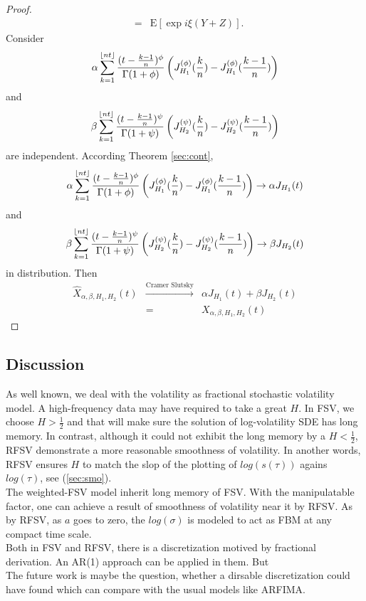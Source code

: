 \documentclass[a4paper, twoside, 11pt]{article}
\theoremstyle{definition}
\DeclarePairedDelimiter\floor{\lfloor}{\rfloor}
\newcommand{\brkt}[1]{\left({#1} \right)}
\begin{document}
\begin{proof}
\begin{eqnarray*}
  &=& \mathrm{E}[\exp{i\xi (Y+Z)}].
\end{eqnarray*}
Consider 
$$
\alpha\sum_{k=1}^{\floor{nt}} \frac{(t - \frac{k-1}{n})^\phi}{\Gamma(1+\phi)} \brkt{J_{H_1}^{(\phi)}(\frac{k}{n}) - J_{H_1}^{(\phi)}(\frac{k-1}{n})}$$
and 
$$\beta\sum_{k=1}^{\floor{nt}} \frac{(t - \frac{k-1}{n})^\psi}{\Gamma(1+\psi)} \brkt{J_{H_2}^{(\psi)}(\frac{k}{n}) - J_{H_2}^{(\psi)}(\frac{k-1}{n})}
$$
are independent. According Theorem \ref{sec:cont}, 
$$
\alpha\sum_{k=1}^{\floor{nt}} \frac{(t - \frac{k-1}{n})^\phi}{\Gamma(1+\phi)} \brkt{J_{H_1}^{(\phi)}(\frac{k}{n}) - J_{H_1}^{(\phi)}(\frac{k-1}{n})} \rightarrow \alpha J_{H_1}(t)
$$ and
$$
\beta\sum_{k=1}^{\floor{nt}} \frac{(t - \frac{k-1}{n})^\psi}{\Gamma(1+\psi)} \brkt{J_{H_2}^{(\psi)}(\frac{k}{n}) - J_{H_2}^{(\psi)}(\frac{k-1}{n})} \rightarrow \beta J_{H_2}(t)
$$ in distribution.
Then
\begin{eqnarray*}
  \hat{X}_{\alpha,\beta,H_1,H_2}(t) &\overset{\text{Cramer Slutsky}}{\rightarrow}& \alpha J_{H_1}(t) + \beta J_{H_2}(t)\\
  &=& X_{\alpha,\beta,H_1,H_2}(t)
\end{eqnarray*}
	\end{proof}
	\subsection{Discussion}
	As well known, we deal with the volatility as fractional stochastic volatility model. A high-frequency data may have required to take a great $H$. In FSV, we choose $H > \frac{1}{2}$ and that will make sure the solution of log-volatility SDE has long memory. In contrast, although it could not exhibit the long memory by a $H < \frac{1}{2}$, RFSV demonstrate a more reasonable smoothness of volatility. In another words, RFSV ensures $H$ to match the slop of the plotting of $log(s(\tau))$ agains $log(\tau)$, see (\ref{sec:smo}).\\
	The weighted-FSV model inherit long memory of FSV. With the manipulatable factor, one can achieve a result of smoothness of volatility near it by RFSV. As by RFSV, as $a$ goes to zero, the $log(\sigma)$ is modeled to act as FBM at any compact time scale.\\
	Both in FSV and RFSV, there is a discretization motived by fractional derivation. An AR(1) approach can be applied in them. But %
	\\
	The future work is maybe the question, whether a dirsable discretization could have found which can compare with the usual models like ARFIMA.
\end{document}
